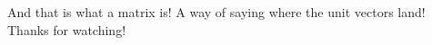 \documentclass[preview]{standalone}
\begin{document}
\begin{minipage}
{8cm}And that is what a matrix is! A way of saying where the unit vectors land! Thanks for watching!
\end{minipage}
\end{document}
